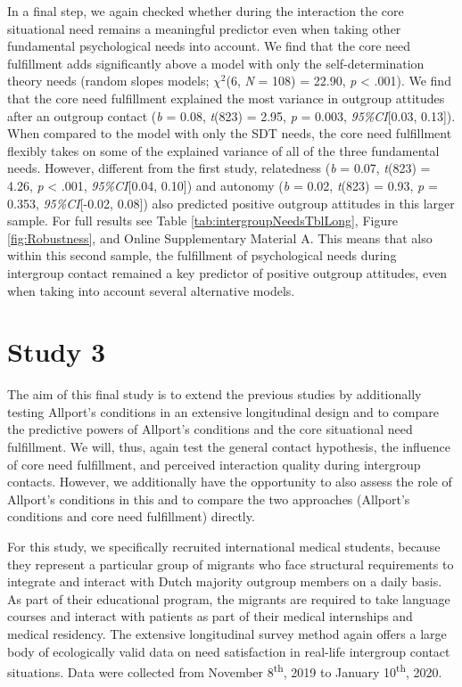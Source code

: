 In a final step, we again checked whether during the interaction the
core situational need remains a meaningful predictor even when taking
other fundamental psychological needs into account. We find that the
core need fulfillment adds significantly above a model with only the
self-determination theory needs (random slopes models; \(\chi^2\)(6,
\textit{N} = 108) = 22.90, \textit{p} \textless{} .001). We find that
the core need fulfillment explained the most variance in outgroup
attitudes after an outgroup contact (\textit{b} = 0.08, \textit{t}(823)
= 2.95, \textit{p} = 0.003, \textit{95\%CI}{[}0.03, 0.13{]}). When
compared to the model with only the SDT needs, the core need fulfillment
flexibly takes on some of the explained variance of all of the three
fundamental needs. However, different from the first study, relatedness
(\textit{b} = 0.07, \textit{t}(823) = 4.26, \textit{p} \textless{} .001,
\textit{95\%CI}{[}0.04, 0.10{]}) and autonomy (\textit{b} = 0.02,
\textit{t}(823) = 0.93, \textit{p} = 0.353, \textit{95\%CI}{[}-0.02,
0.08{]}) also predicted positive outgroup attitudes in this larger
sample. For full results see Table \ref{tab:intergroupNeedsTblLong},
Figure \ref{fig:Robustness}, and Online Supplementary Material A. This
means that also within this second sample, the fulfillment of
psychological needs during intergroup contact remained a key predictor
of positive outgroup attitudes, even when taking into account several
alternative models.

\section{Study 3}

The aim of this final study is to extend the previous studies by
additionally testing Allport's conditions in an extensive longitudinal
design and to compare the predictive powers of Allport's conditions and
the core situational need fulfillment. We will, thus, again test the
general contact hypothesis, the influence of core need fulfillment, and
perceived interaction quality during intergroup contacts. However, we
additionally have the opportunity to also assess the role of Allport's
conditions in this and to compare the two approaches (Allport's
conditions and core need fulfillment) directly.

For this study, we specifically recruited international medical
students, because they represent a particular group of migrants who face
structural requirements to integrate and interact with Dutch majority
outgroup members on a daily basis. As part of their educational program,
the migrants are required to take language courses and interact with
patients as part of their medical internships and medical residency. The
extensive longitudinal survey method again offers a large body of
ecologically valid data on need satisfaction in real-life intergroup
contact situations. Data were collected from November
8\textsuperscript{th}, 2019 to January 10\textsuperscript{th}, 2020.

